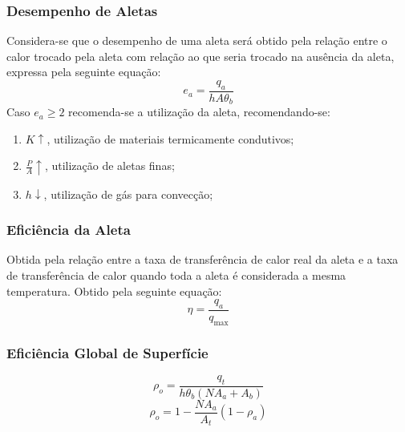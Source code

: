 \documentclass{article}
\begin{document}
        \subsubsection{Desempenho de Aletas}
            \begin{definition}
                Considera-se que o desempenho de uma aleta será obtido pela relação entre o calor trocado pela aleta com relação ao que seria trocado na ausência da aleta, expressa pela seguinte equação:
                    \begin{equation}
                        \boxed{
                            e_{a} = \frac{q_{a}}{h A \theta_{b}}
                        }
                    \end{equation}
                Caso $e_{a} \ge 2$ recomenda-se a utilização da aleta, recomendando-se:
                    \begin{enumerate}
                        \item $K\uparrow$, utilização de materiais termicamente condutivos; 
                        \item $\frac{P}{A}\uparrow$, utilização de aletas finas;
                        \item $h\downarrow$, utilização de gás para convecção; 
                    \end{enumerate}
            \end{definition}

        \subsubsection{Eficiência da Aleta}
            \begin{definition}
                Obtida pela relação entre a taxa de transferência de calor real da aleta e a taxa de transferência de calor quando toda a aleta é considerada a mesma temperatura. Obtido pela seguinte equação:
                    \begin{equation}
                        \boxed{
                            \eta = \frac{q_{a}}{q_{\text{max}}} 
                        }
                    \end{equation}
            \end{definition}

        \subsubsection{Eficiência Global de Superfície}
            \begin{definition}
                \begin{equation}
                    \boxed{
                        \rho_{o} = \frac{q_{t}}{h \theta_{b} (N A_{a} + A_{b})}
                    }
                \end{equation}
                \begin{equation}
                    \boxed{
                        \rho_{o} = 1 - \frac{N A_{a}}{A_{t}}(1 - \rho_{a})
                    }
                \end{equation}
            \end{definition}
\end{document}
